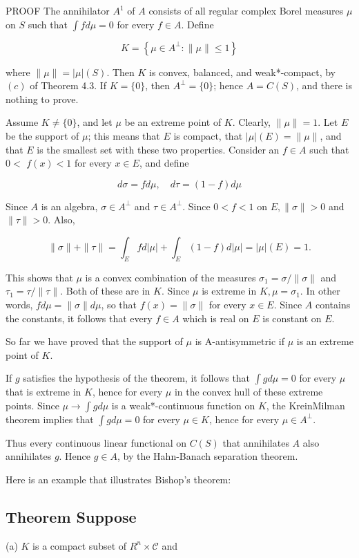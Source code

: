 \documentclass[10pt]{article}
\begin{document}
PROOF The annihilator $A^{1}$ of $A$ consists of all regular complex Borel measures $\mu$ on $S$ such that $\int f d \mu=0$ for every $f \in A$. Define

$$
K=\left\{\mu \in A^{\perp}:\|\mu\| \leq 1\right\}
$$

where $\|\mu\|=|\mu|(S)$. Then $K$ is convex, balanced, and weak*-compact, by $(c)$ of Theorem 4.3. If $K=\{0\}$, then $A^{\perp}=\{0\}$; hence $A=C(S)$, and there is nothing to prove.

Assume $K \neq\{0\}$, and let $\mu$ be an extreme point of $K$. Clearly, $\|\mu\|=1$. Let $E$ be the support of $\mu$; this means that $E$ is compact, that $|\mu|(E)=\|\mu\|$, and that $E$ is the smallest set with these two properties. Consider an $f \in A$ such that $0<$ $f(x)<1$ for every $x \in E$, and define

$$
d \sigma=f d \mu, \quad d \tau=(1-f) d \mu
$$

Since $A$ is an algebra, $\sigma \in A^{\perp}$ and $\tau \in A^{\perp}$. Since $0<f<1$ on $E,\|\sigma\|>0$ and $\|\tau\|>0$. Also,

$$
\|\sigma\|+\|\tau\|=\int_{E} f d|\mu|+\int_{E}(1-f) d|\mu|=|\mu|(E)=1 .
$$

This shows that $\mu$ is a convex combination of the measures $\sigma_{1}=\sigma /\|\sigma\|$ and $\tau_{1}=\tau /\|\tau\|$. Both of these are in $K$. Since $\mu$ is extreme in $K, \mu=\sigma_{1}$. In other words, $f d \mu=\|\sigma\| d \mu$, so that $f(x)=\|\sigma\|$ for every $x \in E$. Since $A$ contains the constants, it follows that every $f \in A$ which is real on $E$ is constant on $E$.

So far we have proved that the support of $\mu$ is A-antisymmetric if $\mu$ is an extreme point of $K$.

If $g$ satisfies the hypothesis of the theorem, it follows that $\int g d \mu=0$ for every $\mu$ that is extreme in $K$, hence for every $\mu$ in the convex hull of these extreme points. Since $\mu \rightarrow \int g d \mu$ is a weak*-continuous function on $K$, the KreinMilman theorem implies that $\int g d \mu=0$ for every $\mu \in K$, hence for every $\mu \in A^{\perp}$.

Thus every continuous linear functional on $C(S)$ that annihilates $A$ also annihilates $g$. Hence $g \in A$, by the Hahn-Banach separation theorem.

Here is an example that illustrates Bishop's theorem:

\subsection{Theorem Suppose}
(a) $K$ is a compact subset of $R^{n} \times \mathscr{C}$ and
\end{document}
